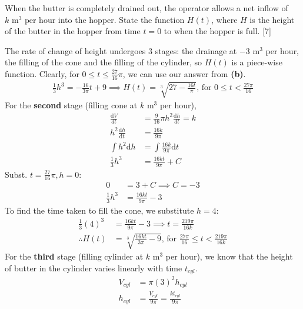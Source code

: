 \documentclass[12pt, a4 paper]{article}
\begin{document}
\begin{outline}[enumerate]
 \2 When the butter is completely drained out, the operator allows a net inflow of $k\textrm{ m}^3{\textrm{ per hour}}$ into the hopper. State the function $H(t)$, where $H$ is the height of the butter in the hopper from time $t=0$ to when the hopper is full. \hfill[7]
 \begin{answer}
  The rate of change of height undergoes 3 stages: the drainage at $-$3 m$^3$ per hour, the filling of the cone and the filling of the cylinder, so $H(t)$ is a piece-wise function. Clearly, for $0 \leq t \leq \frac{27}{16}\pi$, we can use our answer from \textbf{(b)}.
  \begin{align*}
   \frac{1}{3}h^3 = -\frac{16}{3\pi}t + 9 \implies H(t)=\sqrt[3]{27-\frac{16t}{\pi}} \textrm{, for }0 \leq t < \frac{27\pi}{16}
  \end{align*}
  For the \textbf{second} stage (filling cone at $k$ m$^3$ per hour),
  \begin{align*}
   \frac{\mathrm{d}V}{{d}t}                     & = \frac{9}{16}\pi h^2\frac{\mathrm{d}h}{{d}t} = k \\
   {h^2}\frac{{{\mathrm{d}}h}}{{{\mathrm{d}}t}} & = \frac{{16k}}{{9\pi }}                           \\
   \int {h^2}\mathrm{d}h                        & = \int \frac{16k}{9\pi} \mathrm{d}t               \\
   \frac{1}{3}h^3                               & = \frac{16kt}{9\pi}+C
  \end{align*}
  Subst. $t=\frac{27}{16}\pi,h=0$:
  \begin{align*}
   0              & = 3+C \implies C=-3   \\
   \frac{1}{3}h^3 & = \frac{16kt}{9\pi}-3
  \end{align*}
  To find the time taken to fill the cone, we substitute $h=4$:
  \begin{align*}
   \frac{1}{3}(4)^3 & = \frac{16kt}{9\pi}-3 \implies t=\frac{219\pi}{16k}                                        \\
   \therefore H(t)  & =\sqrt[3]{\frac{16kt}{3\pi}-9} \textrm{, for }\frac{27\pi}{16} \leq t < \frac{219\pi}{16k}
  \end{align*}
  For the \textbf{third} stage (filling cylinder at $k$ m$^3$ per hour), we know that the height of butter in the cylinder varies linearly with time $t_{cyl}$.
  \begin{align*}
   V_{cyl} & =\pi(3)^2h_{cyl}                               \\
   h_{cyl} & = \frac{V_{cyl}}{9\pi} = \frac{kt_{cyl}}{9\pi}

\end{align*}
\end{answer}
\end{outline}
\end{document}
